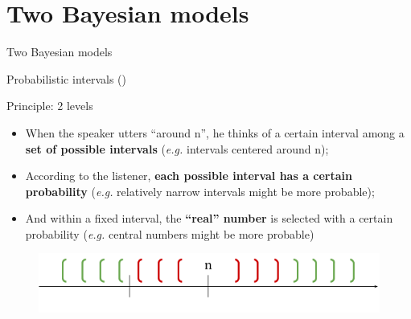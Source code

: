 \documentclass[xcolor=table, hyperref={pdfpagelabels=false}]{beamer}
\begin{document}
\section{Two Bayesian models}
\begin{frame}
\begin{center}{}
	\Huge Two Bayesian models
\end{center}
\end{frame}
\begin{frame}{Probabilistic intervals (\cite{egre2018})}
\begin{block}{Principle: 2 levels}
	\begin{itemize}
		\item When the speaker utters ``around n'', he thinks of a certain interval among a \textbf{set of possible intervals} (\textit{e.g.} intervals centered around n); \pause
		\item According to the listener, \textbf{each possible interval has a certain probability} (\textit{e.g.} relatively narrow intervals might be more probable); \pause
		\item And within a fixed interval, the \textbf{``real'' number} is selected with a certain probability (\textit{e.g.} central numbers might be more probable)
	\end{itemize}
\end{block}
	\begin{figure}
	\includegraphics[width=\textwidth]{./images/intervals.png}
\end{figure}
\end{frame}
\end{document}
